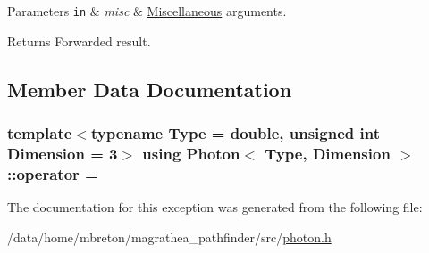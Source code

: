 \begin{DoxyParams}[1]{Parameters}
\mbox{\tt in}  & {\em misc} & \hyperlink{classMiscellaneous}{Miscellaneous} arguments. \\
\hline
\end{DoxyParams}
\begin{DoxyReturn}{Returns}
Forwarded result. 
\end{DoxyReturn}


\subsection{Member Data Documentation}
\hypertarget{exceptionPhoton_ab2d630b986fb370437db93d91f2454b0}{
\subsubsection[{operator}]{\setlength{\rightskip}{0pt plus 5cm}template$<$typename Type = double, unsigned int Dimension = 3$>$ using {\bf Photon}$<$ Type, Dimension $>$\-::operator = }}\label{exceptionPhoton_ab2d630b986fb370437db93d91f2454b0}


The documentation for this exception was generated from the following file\-:\begin{DoxyCompactItemize}
\item 
/data/home/mbreton/magrathea\-\_\-pathfinder/src/\hyperlink{photon_8h}{photon.\-h}\end{DoxyCompactItemize}
